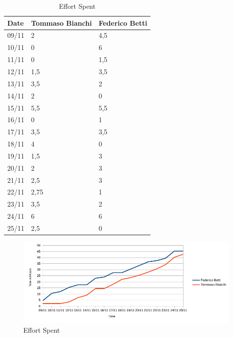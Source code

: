 \begin{table}[H]	
	\centering
	\def\arraystretch{1.25}
	\begin{tabular}{|m{5cm}|m{5cm}|m{5cm}|}
		\hline
		\textbf{Date} & \textbf{Tommaso Bianchi} &  \textbf{Federico Betti}\\ \hline
		09/11 &	2 &		4,5 \\ \hline
		10/11 &	0 &		6 \\ \hline
		11/11 &	0 &		1,5 \\ \hline
		12/11 &	1,5 &	3,5 \\ \hline
		13/11 &	3,5 &	2 \\ \hline
		14/11 &	2 &		0 \\ \hline
		15/11 &	5,5 &	5,5 \\ \hline
		16/11 &	0 &		1 \\ \hline
		17/11 &	3,5 &	3,5 \\ \hline
		18/11 &	4 &		0 \\ \hline
		19/11 &	1,5 &	3 \\ \hline
		20/11 &	2 &		3 \\ \hline
		21/11 &	2,5 &	3 \\ \hline
		22/11 &	2,75 &	1 \\ \hline
		23/11 &	3,5 &	2 \\ \hline
		24/11 &	6 &		6 \\ \hline
		25/11 &	2,5 &		0 \\ \hline
	\end{tabular}
	\caption{Effort Spent}
\end{table}

\begin{figure}[H]
	\centering\includegraphics[width=\textwidth]{Images/EffortSpentGraph}
	\caption{Effort Spent}
\end{figure}